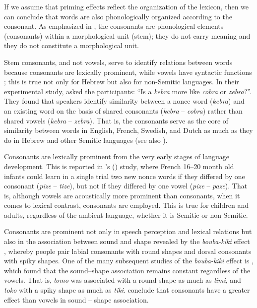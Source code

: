 \documentclass[output=paper,
modfonts
]{LSP/langsci}
\begin{document}
If we assume that priming effects reflect the organization of the
lexicon, then we can conclude that words are also phonologically
organized according to the  consonant. As emphasized in , the
 consonants are phonological elements (consonants) within a
morphological unit (stem); they do not carry meaning and they do not
constitute a morphological unit.

Stem consonants, and not vowels, serve to identify relations between
words because consonants are lexically prominent, while vowels have
syntactic functions \citep{nespor2003a, berent2013a}; this is true not
only for Hebrew but also for non-Semitic languages. In their
experimental study, \citet{cutler2000} asked the participants: ``Is a
\emph{kebra} more like \emph{cobra} or \emph{zebra}?''. They found that
speakers identify similarity between a nonce word (\emph{kebra}) and an
existing word on the basis of shared consonants (\emph{kebra} --
\emph{cobra}) rather than shared vowels (\emph{kebra} -- \emph{zebra}).
That is, the consonants serve as the core of similarity between words in
English, French, Swedish, and Dutch as much as they do in Hebrew and
other Semitic languages (see also \citealt{vanooijen1996a, new2008a, carreiras2009a, winskel2013a}).

Consonants are lexically prominent from the very early stages of
language development. This is reported in \citeauthor{nazzi2007a}'s (\citeauthor{nazzi2007a}) study,
where French 16--20 month old infants could learn in a single trial two
new nonce words if they differed by one consonant (\emph{pize} --
\emph{tize}), but not if they differed by one vowel (\emph{pize} --
\emph{paze}). That is, although vowels are acoustically more prominent
than consonants, when it comes to lexical contrast, consonants are
employed. This is true for children and adults, regardless of the
ambient language, whether it is Semitic or non-Semitic.

Consonants are prominent not only in speech perception and lexical
relations but also in the association between sound and shape revealed
by the \emph{bouba-kiki} effect \citep{kohler1929a}, whereby people pair
labial consonants with round shapes and dorsal consonants with spiky
shapes. One of the many subsequent studies of the \emph{bouba-kiki}
effect is \citet{fort2015a}, which found that the sound--shape
association remains constant regardless of the vowels. That is,
\emph{lomo} was associated with a round shape as much as \emph{limi},
and \emph{toko} with a spiky shape as much as \emph{tiki}. \citet{fort2015a} conclude that consonants have a greater effect than vowels in
sound -- shape association.
\end{document}
